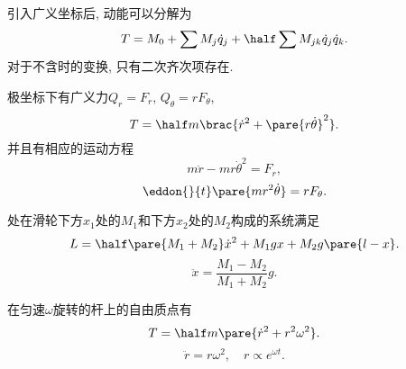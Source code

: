 \documentclass[../TheoreticalMechanics.tex]{subfiles}
\begin{document}
\begin{theorem}[动能的分解]
	\label{thm:动能的分解}
	引入广义坐标后, 动能可以分解为
	\[ T = M_0 + \sum M_j \dot{q}_j + \half\sum M_{jk} \dot{q}_j \dot{q}_k. \]
	对于不含时的变换, 只有二次齐次项存在.
\end{theorem}
\begin{ex}
	极坐标下有广义力$Q_r = F_r$, $Q_\theta = rF_\theta$,
	\[ T = \half m\brac{\dot{r}^2 + \pare{r\dot{\theta}}^2}. \]
	并且有相应的运动方程
	\[ m\ddot{r} - mr\dot{\theta}^2 = F_r, \]
	\[ \eddon{}{t}\pare{mr^2\dot{\theta}} = rF_\theta. \]
\end{ex}
\begin{ex}[Atwood装置]
	处在滑轮下方$x_1$处的$M_1$和下方$x_2$处的$M_2$构成的系统满足
	\[ L = \half\pare{M_1 + M_2} \dot{x}^2 + M_1 gx + M_2 g\pare{l-x}. \]
	\[ \ddot{x} = \frac{M_1 - M_2}{M_1 + M_2}g. \]
\end{ex}
\begin{ex}
	在匀速$\omega$旋转的杆上的自由质点有
	\[ T = \half m\pare{\dot{r}^2 + r^2\omega^2}. \]
	\[ \ddot{r} = r\omega^2,\quad r\propto e^{\omega t}. \]
\end{ex}



\end{document}
